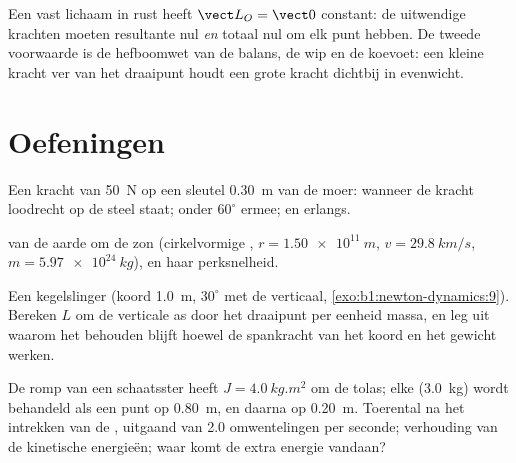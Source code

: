 \begin{remark}[Statica]\label{rem:b1:angular-momentum:statics}
Een vast lichaam in rust heeft $\vect L_O = \vect 0$ constant: de uitwendige krachten
moeten resultante nul \emph{en} totaal  nul om elk punt hebben.
De tweede voorwaarde is de hefboomwet van de balans, de wip en
de koevoet: een kleine kracht ver van het draaipunt houdt een grote kracht dichtbij
in evenwicht.
\end{remark}

\section{Oefeningen}

\begin{exercise}[$\star$]\label{exo:b1:angular-momentum:1}
Een kracht van \qty{50}{N} op een sleutel \qty{0.30}{m} van de moer:  wanneer
de kracht loodrecht op de steel staat; onder $60^\circ$ ermee; en erlangs.
\end{exercise}

\begin{exercise}[$\star$]\label{exo:b1:angular-momentum:2}
 van de aarde om de zon (cirkelvormige ,
$r = \qty{1.50e11}{m}$, $v = \qty{29.8}{km/s}$, $m = \qty{5.97e24}{kg}$),
en haar perksnelheid.
\end{exercise}

\begin{exercise}[$\star$]\label{exo:b1:angular-momentum:3}
Een kegelslinger (koord \qty{1.0}{m}, $30^\circ$ met de verticaal,
\cref{exo:b1:newton-dynamics:9}). Bereken $L$ om de verticale as
door het draaipunt per eenheid massa, en leg uit waarom het behouden blijft
hoewel de spankracht van het koord en het gewicht werken.
\end{exercise}

\begin{exercise}[$\star$]\label{exo:b1:angular-momentum:4}
De romp van een schaatsster heeft $J = \qty{4.0}{kg.m^2}$ om de tolas; elke
 (\qty{3.0}{kg}) wordt behandeld als een punt op \qty{0.80}{m}, en daarna op
\qty{0.20}{m}. Toerental na het intrekken van de , uitgaand van
\qty{2.0}{} omwentelingen per seconde; verhouding van de kinetische energieën; waar komt de
extra energie vandaan?
\end{exercise}

